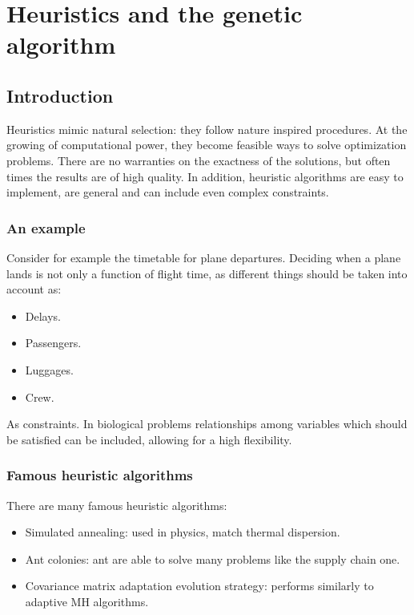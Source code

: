 \graphicspath{{chapters/12/images/}}
\chapter{Heuristics and the genetic algorithm}

\section{Introduction}
Heuristics mimic natural selection: they follow nature inspired procedures.
At the growing of computational power, they become feasible ways to solve optimization problems.
There are no warranties on the exactness of the solutions, but often times the results are of high quality.
In addition, heuristic algorithms are easy to implement, are general and can include even complex constraints.

  \subsection{An example}
  Consider for example the timetable for plane departures.
  Deciding when a plane lands is not only a function of flight time, as different things should be taken into account as:

  \begin{multicols}{4}
    \begin{itemize}
      \item Delays.
      \item Passengers.
      \item Luggages.
      \item Crew.
    \end{itemize}
  \end{multicols}

  As constraints.
  In biological problems relationships among variables which should be satisfied can be included, allowing for a high flexibility.

  \subsection{Famous heuristic algorithms}
  There are many famous heuristic algorithms:

  \begin{multicols}{2}
    \begin{itemize}
      \item Simulated annealing: used in physics, match thermal dispersion.
      \item Ant colonies: ant are able to solve many problems like the supply chain one.
      \item Covariance matrix adaptation evolution strategy: performs similarly to adaptive MH algorithms.
    \end{itemize}
  \end{multicols}

